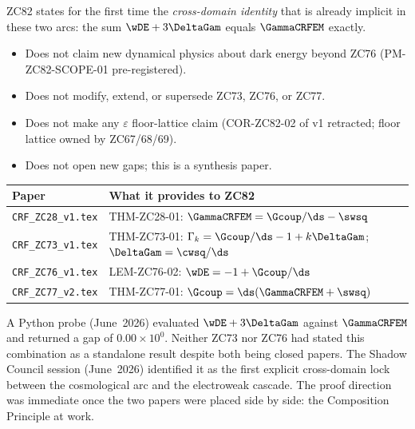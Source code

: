 \documentclass[12pt, a4paper]{article}
\begin{document}
ZC82 states for the first time the \emph{cross-domain identity}
that is already implicit in these two arcs: the sum
$\wDE + 3\DeltaGam$ equals $\GammaCRFEM$ exactly.

\begin{keybox}[title={What ZC82 Does NOT Do}]
\begin{itemize}[leftmargin=2em, noitemsep]
  \item Does not claim new dynamical physics about dark energy
    beyond ZC76 (PM-ZC82-SCOPE-01 pre-registered).
  \item Does not modify, extend, or supersede ZC73, ZC76, or ZC77.
  \item Does not make any $\varepsilon$ floor-lattice claim
    (COR-ZC82-02 of v1 retracted; floor lattice owned by ZC67/68/69).
  \item Does not open new gaps; this is a synthesis paper.
\end{itemize}
\end{keybox}

\begin{keybox}[title={Companion Papers --- ZC82}]
{\small\renewcommand{\arraystretch}{1.25}
\begin{center}
\begin{tabular}{@{}p{4.5cm}p{8.0cm}@{}}
\toprule
\textbf{Paper} & \textbf{What it provides to ZC82} \\
\midrule
\texttt{CRF\_ZC28\_v1.tex}
  & THM-ZC28-01: $\GammaCRFEM = \Gcoup/\ds - \swsq$ \\
\texttt{CRF\_ZC73\_v1.tex}
  & THM-ZC73-01: $\Gamma_k = \Gcoup/\ds - 1 + k\DeltaGam$;
    $\DeltaGam = \cwsq/\ds$ \\
\texttt{CRF\_ZC76\_v1.tex}
  & LEM-ZC76-02: $\wDE = -1 + \Gcoup/\ds$ \\
\texttt{CRF\_ZC77\_v2.tex}
  & THM-ZC77-01: $\Gcoup = \ds(\GammaCRFEM + \swsq)$ \\
\bottomrule
\end{tabular}
\end{center}}
\end{keybox}

\begin{derivedbox}[title={Discovery Note}]
A Python probe (June~2026) evaluated $\wDE + 3\DeltaGam$ against
$\GammaCRFEM$ and returned a gap of $0.00\times10^0$. Neither
ZC73 nor ZC76 had stated this combination as a standalone result
despite both being closed papers. The Shadow Council session
(June~2026) identified it as the first explicit cross-domain
lock between the cosmological arc and the electroweak cascade.
The proof direction was immediate once the two papers were placed
side by side: the Composition Principle at work.
\end{derivedbox}
\end{document}
